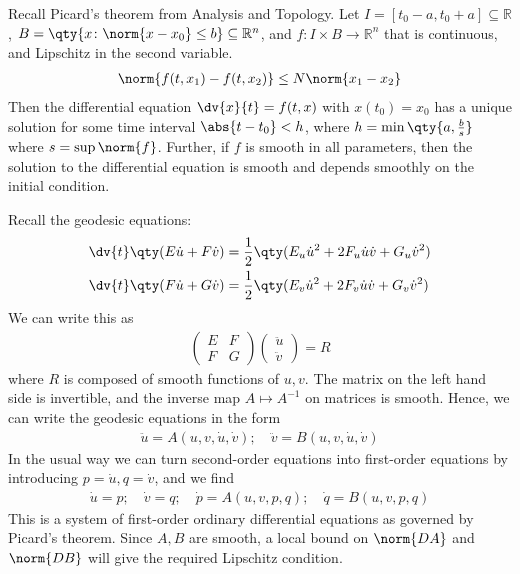 Recall Picard's theorem from Analysis and Topology.
Let $I = [t_0 - a, t_0 + a] \subseteq \mathbb R$, $B = \qty{x \colon \norm{x-x_0} \leq b} \subseteq \mathbb R^n$, and $f \colon I \times B \to \mathbb R^n$ that is continuous, and Lipschitz in the second variable.
\begin{align*}
	\norm{f(t,x_1) - f(t,x_2)} \leq N \norm{x_1-x_2}
\end{align*}
Then the differential equation $\dv{x}{t} = f(t,x)$ with $x(t_0) = x_0$ has a unique solution for some time interval $\abs{t-t_0} < h$, where $h = \min\qty{a,\frac{b}{s}}$ where $s = \sup \norm{f}$.
Further, if $f$ is smooth in all parameters, then the solution to the differential equation is smooth and depends smoothly on the initial condition.

Recall the geodesic equations:
\begin{align*}
	\dv{t} \qty(E \dot u + F \dot v) & = \frac{1}{2} \qty( E_u \dot u^2 + 2F_u \dot u \dot v + G_u \dot v^2 ) \\
	\dv{t} \qty(F \dot u + G \dot v) & = \frac{1}{2} \qty( E_v \dot u^2 + 2F_v \dot u \dot v + G_v \dot v^2 )
\end{align*}
We can write this as
\begin{align*}
	\begin{pmatrix}
		E & F \\
		F & G
	\end{pmatrix} \begin{pmatrix}
		\ddot u \\
		\ddot v
	\end{pmatrix}= R
\end{align*}
where $R$ is composed of smooth functions of $u,v$.
The matrix on the left hand side is invertible, and the inverse map $A \mapsto A^{-1}$ on matrices is smooth.
Hence, we can write the geodesic equations in the form
\begin{align*}
	\ddot u = A(u, v, \dot u, \dot v);\quad \ddot v = B(u, v, \dot u, \dot v)
\end{align*}
In the usual way we can turn second-order equations into first-order equations by introducing $p = \dot u, q = \dot v$, and we find
\begin{align*}
	\dot u = p;\quad \dot v = q;\quad \dot p = A(u,v,p,q);\quad \dot q = B(u,v,p,q)
\end{align*}
This is a system of first-order ordinary differential equations as governed by Picard's theorem.
Since $A, B$ are smooth, a local bound on $\norm{DA}$ and $\norm{DB}$ will give the required Lipschitz condition.
